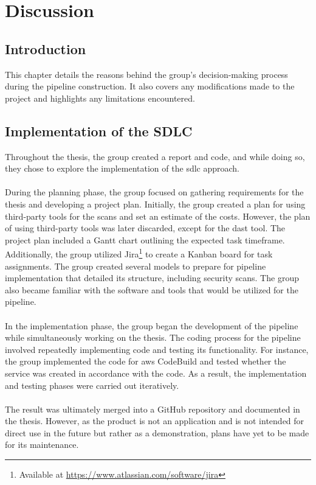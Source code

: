 \newpage
\thispagestyle{empty}
\mbox{}

\chapter{Discussion}
\section{Introduction}
This chapter details the reasons behind the group's decision-making process during the pipeline construction. It also covers any modifications made to the project and highlights any limitations encountered.

\section{Implementation of the SDLC}
Throughout the thesis, the group created a report and code, and while doing so, they chose to explore the implementation of the \acrshort{sdlc} approach.
\\~\\
During the planning phase, the group focused on gathering requirements for the thesis and developing a project plan. Initially, the group created a plan for using third-party tools for the scans and set an estimate of the costs. However, the plan of using third-party tools was later discarded, except for the \acrshort{dast} tool. The project plan included a Gantt chart outlining the expected task timeframe. Additionally, the group utilized Jira\footnote{Available at \url{https://www.atlassian.com/software/jira}} to create a Kanban board for task assignments. The group created several models to prepare for pipeline implementation that detailed its structure, including security scans. The group also became familiar with the software and tools that would be utilized for the pipeline.
\\~\\
In the implementation phase, the group began the development of the pipeline while simultaneously working on the thesis. The coding process for the pipeline involved repeatedly implementing code and testing its functionality. For instance, the group implemented the code for \acrshort{aws} CodeBuild and tested whether the service was created in accordance with the code. As a result, the implementation and testing phases were carried out iteratively.
\\~\\
The result was ultimately merged into a GitHub repository and documented in the thesis. However, as the product is not an application and is not intended for direct use in the future but rather as a demonstration, plans have yet to be made for its maintenance. 

